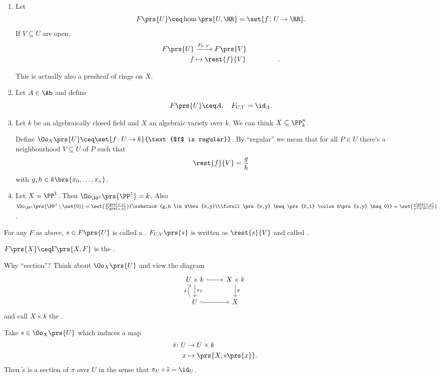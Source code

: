 \documentclass[10pt,a4paper,twoside,openany,hidelinks]{book}
\begin{document}
\begin{examples}
\begin{enumerate}
\item Let \[F\prs{U} \ceq \hom\prs{U, \RR} = \set{f \colon U \to \RR} \text{.}\]
If $V \subseteq U$ are open,
\begin{align*}
F\prs{U} &\xrightarrow{F_{U,V}} F\prs{V} \\
f &\mapsto \rest{f}{V} \hphantom{F\prs{V}} \text{.}
\end{align*}

This is actually also a presheaf of rings on $X$.

\item {} Let $A \in \Ab$ and define
\[F\prs{U} \ceq A, \quad F_{U,V} = \id_A \text{.}\]

\item Let $k$ be an algebraically closed field and $X$ an algebraic variety over $k$. We can think $X \subseteq \PP_k^n$.

Define $\Oo_X\prs{U} \ceq \set{f \colon U \to k}{\text{$f$ is regular}}$.
By ``regular'' we mean that for all $P \in U$ there's a neighbourhood $V \subseteq U$ of $P$ such that
\[\rest{f}{V} = \frac{g}{h}\]
with
$g,h \in k\brs{x_0, \ldots, x_n}$.

\item Let $X = \PP^1$.
Then
$\Oo_{\PP^1}\prs{\PP^1} = k$.
Also
$\Oo_{\PP^1} \prs{\PP^1 \setminus \set{0}} = \set{\frac{g\prs{x,y}}{h\prs{x,y}}}{\substack{g,h \in k\brs{x,y}\\\forall \prs{x,y} \neq \prs{0,1} \colon h\prs{x,y} \neq 0}} = \set{\frac{g\prs{x,y}}{x^{\deg\prs{g}}}}$.
\end{enumerate}
\end{examples}

\begin{definition}
For any $F$ as above, $s \in F\prs{U}$ is called a .
$F_{U,V}\prs{s}$ is written as $\rest{s}{V}$ and called .
\end{definition}

\begin{definition}
$F\prs{X} \ceq \Gamma\prs{X,F}$ is the .
\end{definition}

\begin{remark}
Why ``section''? Think about $\Oo_X\prs{U}$ and view the diagram
\[
\begin{tikzcd}
U \times k \arrow[d,"\pi_U"] \arrow[r, hook] & X \times k \arrow[d,"\pi"] \\
U \arrow[u, "\tilde{s}", bend left = 40] \arrow[r, hook] & X
\end{tikzcd}
\]
and call $X \times k$ the .

Take $s \in \Oo_X\prs{U}$ which induces a map
\begin{align*}
\tilde{s} \colon U &\to U \times k \\
x &\mapsto \prs{X, s\prs{x}} \text{.}
\end{align*}
Then $\tilde{s}$ is a {section of $\pi$ over $U$}
in the sense that $\pi_U \circ \tilde{s} = \id_U$.
\end{remark}
\end{document}

